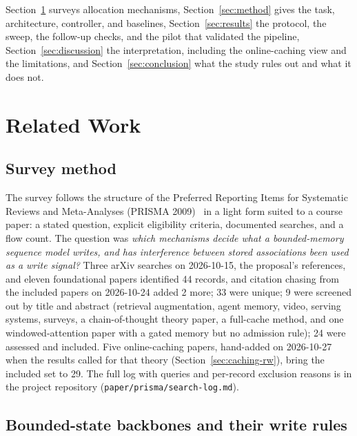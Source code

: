 \documentclass[conference]{IEEEtran}
\begin{document}
Section~\ref{sec:related} surveys allocation mechanisms, Section~\ref{sec:method}
gives the task, architecture, controller, and baselines,
Section~\ref{sec:results} the protocol, the sweep, the follow-up checks, and
the pilot that validated the pipeline, Section~\ref{sec:discussion} the
interpretation, including the online-caching view and the limitations, and
Section~\ref{sec:conclusion} what the study rules out and what it does not.

\section{Related Work}
\label{sec:related}

\subsection{Survey method}

The survey follows the structure of the Preferred Reporting Items for
Systematic Reviews and Meta-Analyses (PRISMA 2009)~\cite{moher2009prisma} in a
light form suited to a course paper: a stated question, explicit eligibility criteria, documented
searches, and a flow count. The question was \emph{which mechanisms decide what
a bounded-memory sequence model writes, and has interference between stored
associations been used as a write signal?} Three arXiv searches on 2026-10-15,
the proposal's references, and eleven foundational papers identified 44
records, and citation chasing from the included papers on 2026-10-24 added
2 more; 33 were unique; 9 were screened out by title and abstract
(retrieval augmentation, agent memory, video, serving systems, surveys, a
chain-of-thought theory paper, a full-cache method, and one windowed-attention
paper with a gated memory but no admission rule); 24 were assessed and
included. Five online-caching papers, hand-added on 2026-10-27 when the
results called for that theory (Section~\ref{sec:caching-rw}), bring the
included set to 29. The full log with queries and per-record
exclusion reasons is in the project repository
(\texttt{paper/prisma/search-log.md}).

\subsection{Bounded-state backbones and their write rules}
\end{document}
